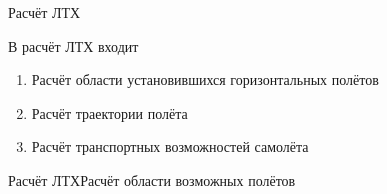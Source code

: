 \begin{frame}{Расчёт ЛТХ}
\begin{block}{В расчёт ЛТХ входит}
   \begin{enumerate}
    \item Расчёт области установившихся горизонтальных полётов  
    \item Расчёт траектории полёта 
    \item Расчёт транспортных возможностей самолёта
   \end{enumerate}
\end{block}
\end{frame}







\begin{frame}{Расчёт ЛТХ}{Расчёт области возможных полётов}
\end{frame}

